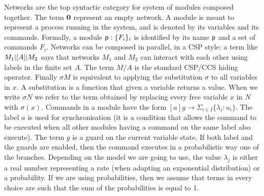 Networks are the top syntactic category for system of modules composed
together. The term $\mathbf{0}$ represent an empty network. A module is
meant to represent a process running in the system, and is denoted by
its variables and its commands. Formally, a module
$\textsf{p}:\{F_i\}_i$ is identified by its name $\textsf{p}$ and a set of
commands $F_i$. Networks can be composed in parallel, in a CSP style:
a term like $M_1 |[A]| M_2$ says that networks $M_1$ and $M_2$ can
interact with each other using labels in the finite set $A$. The term
$M/A$ is the standard CSP/CCS hiding operator. Finally $\sigma M$ is
equivalent to applying the substitution $\sigma$ to all variables in
$x$. A substitution is a function that given a variable returns a
value. When we write $\sigma N$ we refer to the term obtained by
replacing every free variable $x$ in $N$ with $\sigma(x)$.   Commands in a module have the form
$[a] g \rightarrow \Sigma_{i\in I}\{\lambda_i: u_i\}$. The label $a$
is used for synchronisation (it is a condition that allows the command
to be executed when all other modules having a command on the same
label also execute).  The term $g$ is a guard on the current variable
state. If both label and the guards are enabled, then the command
executes in a probabilistic way one of the branches.  Depending on the
model we are going to use, the value $\lambda_j$ is either a real
number representing a rate (when adapting an exponential distribution)
or a probability. If we are using probabilities, then we assume that
terms in every choice are such that the sum of the probabilities is
equal to 1.

